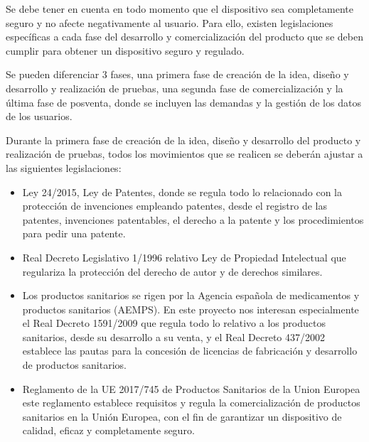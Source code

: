 Se debe tener en cuenta en todo momento que el dispositivo sea completamente seguro y no afecte negativamente al usuario. Para ello, existen legislaciones específicas a cada fase del desarrollo y comercialización del producto que se deben cumplir para obtener un dispositivo seguro y regulado.

Se pueden diferenciar 3 fases, una primera fase de creación de la idea, diseño y desarrollo y realización de pruebas, una segunda fase de comercialización y la última fase de posventa, donde se incluyen las demandas y la gestión de los datos de los usuarios.

Durante la primera fase de creación de la idea, diseño y desarrollo del producto y realización de pruebas, todos los movimientos que se realicen se deberán ajustar a las siguientes legislaciones:
\begin{itemize}
    \item Ley 24/2015\cite{patentes}, Ley de Patentes, donde se regula todo lo relacionado con la protección de invenciones empleando patentes, desde el registro de las patentes, invenciones patentables, el derecho a la patente y los procedimientos para pedir una patente.
    
    \item Real Decreto Legislativo 1/1996\cite{PropIntelectual} relativo Ley de Propiedad Intelectual que regulariza la protección del derecho de autor y de derechos similares.
    
    \item Los productos sanitarios se rigen por la Agencia española de medicamentos y productos sanitarios (AEMPS)\cite{AEMPS}. En este proyecto nos interesan especialmente el Real Decreto 1591/2009\cite{prodSanitario1} que regula todo lo relativo a los productos sanitarios, desde su desarrollo a su venta, y el Real Decreto 437/2002\cite{prodSanitario2} establece las pautas para la concesión de licencias de fabricación y desarrollo de productos sanitarios.
    
    \item Reglamento de la UE 2017/745\cite{ProdSanitariosEU} de Productos Sanitarios de la Union Europea este reglamento establece requisitos y regula la comercialización de productos sanitarios en la Unión Europea, con el fin de garantizar un dispositivo de calidad, eficaz y completamente seguro.
    

\end{itemize}
